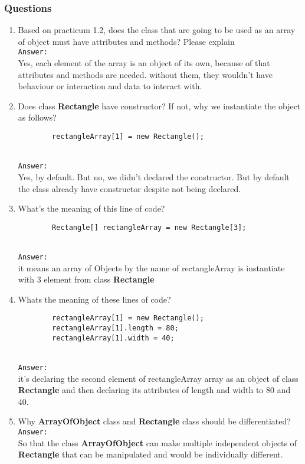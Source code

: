 \documentclass[12pt,titlepage]{article}
\begin{document}
\subsubsection{Questions}

\begin{enumerate}
    \item Based on practicum 1.2, does the class that are going to be used as an array of object must have attributes and methods? Please explain
    \mbox{}\\ \texttt{Answer:}
    \mbox{}\\ Yes, each element of the array is an object of its own, because of that attributes and methods are needed. without them, they wouldn't have behaviour or interaction and data to interact with.
    \item Does class \textbf{Rectangle} have constructor? If not, why we instantiate the object as follows? 
    \begin{verbatim}
        rectangleArray[1] = new Rectangle();
    \end{verbatim}
    \mbox{}\\ \texttt{Answer:}
    \mbox{}\\ Yes, by default. But no, we didn't declared the constructor. But by default the class already have constructor despite not being declared.
    \item What’s the meaning of this line of code?
    \begin{verbatim}
        Rectangle[] rectangleArray = new Rectangle[3];
    \end{verbatim}
    \mbox{}\\ \texttt{Answer:}
    \mbox{}\\ it means an array of Objects by the name of rectangleArray is instantiate with 3 element from class \textbf{Rectangle}
    \item Whats the meaning of these lines of code? 
    \begin{verbatim}
        rectangleArray[1] = new Rectangle();
        rectangleArray[1].length = 80;
        rectangleArray[1].width = 40;
    \end{verbatim}
    \mbox{}\\ \texttt{Answer:}
    \mbox{}\\ it's declaring the second element of rectangleArray array as an object of class \textbf{Rectangle} and then declaring its attributes of length and width to 80 and 40.
    \item Why \textbf{ArrayOfObject} class and \textbf{Rectangle} class should be differentiated?
    \mbox{}\\ \texttt{Answer:}
    \mbox{}\\ So that the class \textbf{ArrayOfObject} can make multiple independent objects of \textbf{Rectangle} that can be manipulated and would be individually different.
\end{enumerate}
\end{document}
